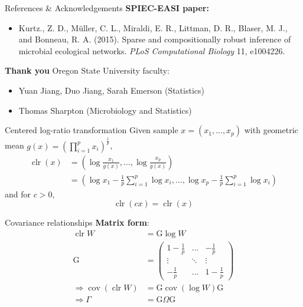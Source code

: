 \documentclass[professionalfonts]{beamer}
\newcommand{\clr}{\operatorname{clr}}
\newcommand{\cov}{\operatorname{cov}}
\begin{document}
\begin{frame}{References \& Acknowledgements}
\textbf{SPIEC-EASI paper:}
\begin{itemize}
\item Kurtz., Z. D., M{\"u}ller, C. L., Miraldi, E. R., Littman, D. R., Blaser, M. J., and Bonneau, R. A. (2015). Sparse and compositionally robust inference of microbial ecological networks. \textit{PLoS Computational Biology} 11, e1004226.
\end{itemize}

\textbf{Thank you} Oregon State University faculty:
\begin{itemize}
\item Yuan Jiang, Duo Jiang, Sarah Emerson (Statistics)
\item Thomas Sharpton (Microbiology and Statistics)
\end{itemize}
\end{frame}

\appendix

\begin{frame}{Centered log-ratio transformation}
Given sample $x = (x_1, \dots, x_p)$ with geometric mean $g(x) = (\prod_{i=1}^p x_i)^{\frac{1}{p}}$,
\begin{align*}
\clr(x) &= \left( \log \frac{x_1}{g(x)}, \dots, \log \frac{x_p}{g(x)} \right) \\
&= \left( \log x_1 - \frac{1}{p} \sum_{i=1}^p \log x_i, \dots, \log x_p - \frac{1}{p} \sum_{i=1}^p \log x_i \right)
\end{align*}
and for $c > 0$,
\begin{equation*}
\clr(cx) = \clr(x)
\end{equation*}
\end{frame}

\begin{frame}{Covariance relationships}
\textbf{Matrix form}:
\begin{align*}
\clr W &= \text{G} \log W \\
\text{G} &=
\begin{pmatrix}
1-\frac{1}{p} & \dots & -\frac{1}{p} \\
\vdots & \ddots & \vdots \\
-\frac{1}{p} & \dots & 1-\frac{1}{p}
\end{pmatrix} \\
\Rightarrow \cov(\clr W) &= \text{G} \cov(\log W) \text{G} \\
\Rightarrow \Gamma &= \text{G} \Omega \text{G}
\end{align*}
\end{frame}
\end{document}
